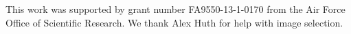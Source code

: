 \documentclass[10pt,letterpaper]{article}
\begin{document}
\vspace{2mm}
\begin{small}
 This work was supported by grant number FA9550-13-1-0170 from the Air Force Office of Scientific Research. We thank Alex Huth for help with image selection.
\end{small}





\setlength{\bibleftmargin}{.125in}
\setlength{\bibindent}{-\bibleftmargin}


\end{document}
